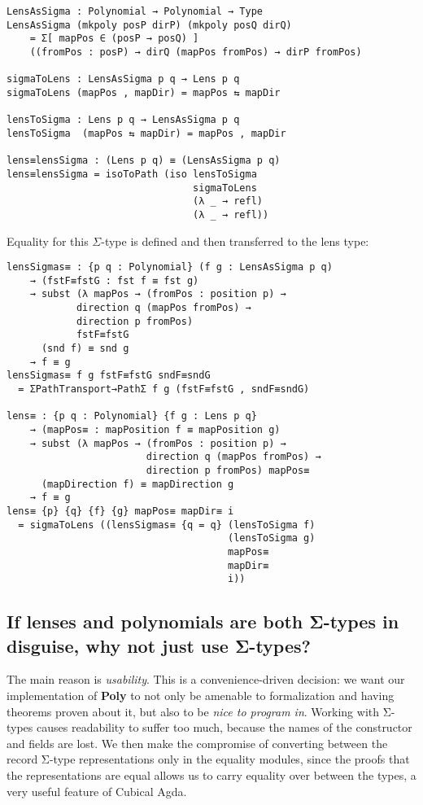 \begin{verbatim}
LensAsSigma : Polynomial → Polynomial → Type
LensAsSigma (mkpoly posP dirP) (mkpoly posQ dirQ)
    = Σ[ mapPos ∈ (posP → posQ) ]
    ((fromPos : posP) → dirQ (mapPos fromPos) → dirP fromPos)
    
sigmaToLens : LensAsSigma p q → Lens p q
sigmaToLens (mapPos , mapDir) = mapPos ⇆ mapDir

lensToSigma : Lens p q → LensAsSigma p q
lensToSigma  (mapPos ⇆ mapDir) = mapPos , mapDir

lens≡lensSigma : (Lens p q) ≡ (LensAsSigma p q)
lens≡lensSigma = isoToPath (iso lensToSigma
                                sigmaToLens 
                                (λ _ → refl)
                                (λ _ → refl))
\end{verbatim}

Equality for this $\Sigma$-type is defined and then transferred to the lens type:

\begin{verbatim}
lensSigmas≡ : {p q : Polynomial} (f g : LensAsSigma p q)
    → (fstF≡fstG : fst f ≡ fst g)
    → subst (λ mapPos → (fromPos : position p) → 
            direction q (mapPos fromPos) → 
            direction p fromPos) 
            fstF≡fstG
      (snd f) ≡ snd g
    → f ≡ g
lensSigmas≡ f g fstF≡fstG sndF≡sndG 
  = ΣPathTransport→PathΣ f g (fstF≡fstG , sndF≡sndG)

lens≡ : {p q : Polynomial} {f g : Lens p q}
    → (mapPos≡ : mapPosition f ≡ mapPosition g) 
    → subst (λ mapPos → (fromPos : position p) → 
                        direction q (mapPos fromPos) → 
                        direction p fromPos) mapPos≡ 
      (mapDirection f) ≡ mapDirection g
    → f ≡ g
lens≡ {p} {q} {f} {g} mapPos≡ mapDir≡ i
  = sigmaToLens ((lensSigmas≡ {q = q} (lensToSigma f) 
                                      (lensToSigma g) 
                                      mapPos≡ 
                                      mapDir≡ 
                                      i))
\end{verbatim}


\subsection*{If lenses and polynomials are both Σ-types in disguise, why not just use Σ-types?}

The main reason is \textit{usability}. This is a convenience-driven decision: we want our implementation of \textbf{Poly} to not only be amenable to formalization and having theorems proven about it, but also to be \textit{nice to program in}. Working with Σ-types causes readability to suffer too much, because the names of the constructor and fields are lost. We then make the compromise of converting between the record Σ-type representations only in the equality modules, since the proofs that the representations are equal allows us to carry equality over between the types, a very useful feature of Cubical Agda.



